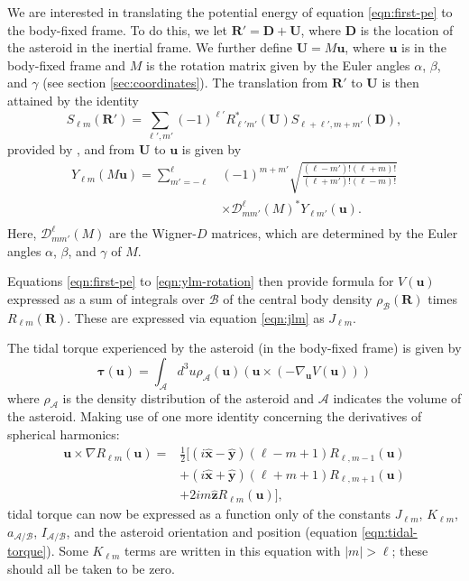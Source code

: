 \documentclass[fleqn,usenatbib]{mnras}
\newcommand{\unit}[1]{\bm{\hat{#1}}}
\begin{document}
We are interested in translating the potential energy of equation \ref{eqn:first-pe} to the body-fixed frame. To do this, we let $\bm{R'} = \bm D + \bm U$, where $\bm D$ is the location of the asteroid in the inertial frame. We further define $\bm U = M\bm u$, where $\bm u$ is in the body-fixed frame and $M$ is the rotation matrix given by the Euler angles $\alpha$, $\beta$, and $\gamma$ (see section \ref{sec:coordinates}). The translation from $\bm {R'}$ to $\bm U$ is then attained by the identity 
\begin{equation}
  S_{\ell m}(\bm R') = \sum_{\ell', m'} (-1)^{\ell'}R^*_{\ell' m'}(\bm U)S_{\ell+\ell', m + m'} (\bm D),
  \label{eqn:ylm-translation}
\end{equation}  
provided by \cite{Gelderen1998TheSO}, and from $\bm U$ to $\bm u$ is given by
\begin{equation}
  \begin{split}
    Y_{\ell m}(M\bm u) = \sum_{m'=-\ell}^\ell & (-1)^{m+m'}\sqrt{\frac{(\ell-m')!(\ell+m)!}{(\ell+m')!(\ell-m)!}} \\
    & \times \mathcal{D}^\ell_{mm'}(M)^* Y_{\ell m'}(\bm u).\\
  \end{split}
  \label{eqn:ylm-rotation}
\end{equation}
Here, $\mathcal{D}^\ell_{mm'}(M)$ are the Wigner-$D$ matrices, which are determined by the Euler angles $\alpha$, $\beta$, and $\gamma$ of $M$.

Equations \ref{eqn:first-pe} to \ref{eqn:ylm-rotation} then provide formula for $V(\bm u)$ expressed as a sum of integrals over $\mathcal{B}$ of the central body density $\rho_\mathcal{B}(\bm R)$ times $R_{\ell m}(\bm R)$. These are expressed via equation \ref{eqn:jlm} as $J_{\ell m}$.

The tidal torque experienced by the asteroid (in the body-fixed frame) is given by
\begin{equation}
  \bm{\tau}(\bm u) = \int_\mathcal{A} d^3 u \rho_\mathcal{A}(\bm u) (\bm u \times (-\nabla_{\bm u} V(\bm u)))
\end{equation}
where $\rho_\mathcal{A}$ is the density distribution of the asteroid and $\mathcal{A}$ indicates the volume of the asteroid. Making use of one more identity concerning the derivatives of spherical harmonics:
\begin{equation}
  \begin{split}
  \bm u \times \nabla R_{\ell m}(\bm u)=&\frac{1}{2}\Big[(i\unit x - \unit y)(\ell-m+1)R_{\ell,m-1}(\bm u)\\
  &+(i\unit x+\unit y)(\ell+m+1)R_{\ell,m+1}(\bm u)\\
  & +2im\unit z R_{\ell m}(\bm u)\Big],
  \end{split}
\end{equation}
tidal torque can now be expressed as a function only of the constants $J_{\ell m}$, $K_{\ell m}$, $a_\mathcal{A/B}$, $I_\mathcal{A/B}$, and the asteroid orientation and position (equation \ref{eqn:tidal-torque}). Some $K_{\ell m}$ terms are written in this equation with $|m|>\ell$; these should all be taken to be zero.
\end{document}
